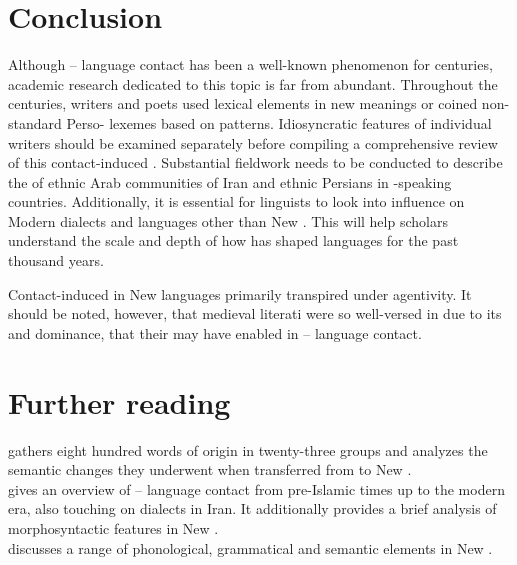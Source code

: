 \documentclass[output=paper]{langsci/langscibook}
\begin{document}
\section{Conclusion}

Although – language contact has been a well-known phenomenon for centuries, academic research dedicated to this topic is far from abundant. Throughout the centuries,  writers and poets used  lexical elements in new meanings or coined non-standard Perso- lexemes based on   patterns. Idiosyncratic features of individual  writers should be examined separately before compiling a comprehensive review of this contact-induced . Substantial fieldwork needs to be conducted to describe the  of ethnic Arab communities of Iran and ethnic Persians in -speaking countries. Additionally, it is essential for linguists to look into  influence on Modern  dialects and  languages other than New . This will help scholars understand the scale and depth of how  has shaped  languages for the past thousand years.

Contact-induced  in New  languages primarily transpired under  agentivity. It should be noted, however, that medieval  literati were so well-versed in  due to its  and dominance, that their  may have enabled  in – language contact.

\section*{Further reading}

\citet{Asbaghi1987} gathers eight hundred  words of  origin in twenty-three groups and analyzes the semantic changes they underwent when transferred from  to New .\\
\citet{Gazsi2011} gives an overview of – language contact from pre-Islamic times up to the modern era, also touching on  dialects in Iran. It additionally provides a brief analysis of  morphosyntactic features in New .\\
\citet{Ṣādiqī2011} discusses a range of  phonological, grammatical and semantic elements in New .
\end{document}
